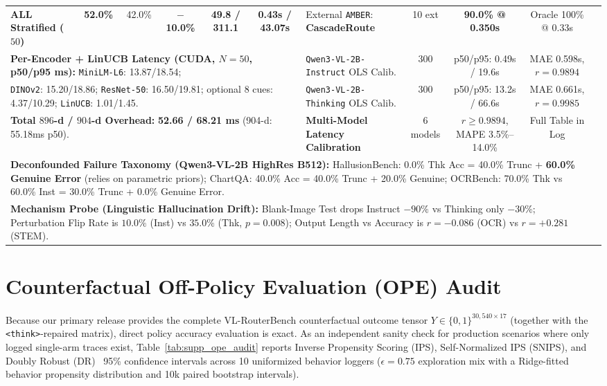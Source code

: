 \documentclass[10pt,twocolumn,letterpaper]{article}
\begin{document}
\begin{table}[t]
{\begin{tabular}{lccccc|lcccc}
\midrule
\textbf{ALL Stratified ($50$)} & \textbf{52.0\%} & 42.0\% & \textbf{$-$10.0\%} & \textbf{49.8 / 311.1} & \textbf{0.43s / 43.07s} & External \texttt{AMBER}: \textbf{CascadeRoute} & 10 ext & \textbf{90.0\% @ 0.350s} & Oracle 100\% @ 0.33s \\
\multicolumn{6}{l|}{\textbf{Per-Encoder + LinUCB Latency (CUDA, $N{=}50$, p50/p95 ms):} \texttt{MiniLM-L6}: 13.87/18.54;} & \texttt{Qwen3-VL-2B-Instruct} OLS Calib. & 300 & p50/p95: 0.49s / 19.6s & MAE 0.598s, $r{=}0.9894$ \\
\multicolumn{6}{l|}{\texttt{DINOv2}: 15.20/18.86; \texttt{ResNet-50}: 16.50/19.81; optional 8 cues: 4.37/10.29; \texttt{LinUCB}: 1.01/1.45.} & \texttt{Qwen3-VL-2B-Thinking} OLS Calib. & 300 & p50/p95: 13.2s / 66.6s & MAE 0.661s, $r{=}0.9985$ \\
\multicolumn{6}{l|}{\textbf{Total $896$-d / $904$-d Overhead:} \textbf{52.66 / 68.21 ms} (904-d: 55.18ms p50).} & \textbf{Multi-Model Latency Calibration} & 6 models & $r \ge 0.9894$, MAPE 3.5\%--14.0\% & Full Table in Log \\
\midrule
\multicolumn{10}{l}{\textbf{Deconfounded Failure Taxonomy (Qwen3-VL-2B HighRes B512):} HallusionBench: 0.0\% Thk Acc = 40.0\% Trunc + \textbf{60.0\% Genuine Error} (relies on parametric priors); ChartQA: 40.0\% Acc = 40.0\% Trunc + 20.0\% Genuine; OCRBench: 70.0\% Thk vs 60.0\% Inst = 30.0\% Trunc + 0.0\% Genuine Error.} \\
\multicolumn{10}{l}{\textbf{Mechanism Probe (Linguistic Hallucination Drift):} Blank-Image Test drops Instruct $-90\%$ vs Thinking only $-30\%$; Perturbation Flip Rate is $10.0\%$ (Inst) vs $35.0\%$ (Thk, $p{=}0.008$); Output Length vs Accuracy is $r{=}-0.086$ (OCR) vs $r{=}+0.281$ (STEM).} \\
\bottomrule
\end{tabular}%
}
\end{table}

\section{Counterfactual Off-Policy Evaluation (OPE) Audit}
\label{sec:supp_ope}

Because our primary release provides the complete VL-RouterBench counterfactual outcome tensor $Y \in \{0,1\}^{30{,}540 \times 17}$ (together with the \texttt{<think>}-repaired matrix), direct policy accuracy evaluation is exact. As an independent sanity check for production scenarios where only logged single-arm traces exist, Table~\ref{tab:supp_ope_audit} reports Inverse Propensity Scoring (IPS), Self-Normalized IPS (SNIPS), and Doubly Robust (DR)~\citep{dudik2011doubly,swaminathan2015self} 95\% confidence intervals across 10 uniformized behavior loggers ($\epsilon{=}0.75$ exploration mix with a Ridge-fitted behavior propensity distribution and 10k paired bootstrap intervals).
\end{document}
